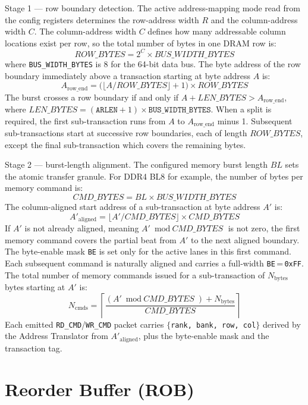 \documentclass[10pt]{article}
\begin{document}
Stage 1 — row boundary detection. The active address-mapping mode read from the config registers determines the row-address width $R$ and the column-address width $C$. The column-address width $C$ defines how many addressable column locations exist per row, so the total number of bytes in one DRAM row is:
\[
  \textit{ROW\_BYTES} = 2^{C} \times \textit{BUS\_WIDTH\_BYTES}
\]
where \texttt{BUS\_WIDTH\_BYTES} is 8 for the 64-bit data bus. The byte address of the row boundary immediately above a transaction starting at byte address $A$ is:
\[
  A_{\text{row\_end}} = \bigl(\lfloor A / \textit{ROW\_BYTES} \rfloor + 1\bigr)
                        \times \textit{ROW\_BYTES}
\]
The burst crosses a row boundary if and only if $A + \textit{LEN\_BYTES} > A_{\text{row\_end}}$, where $\textit{LEN\_BYTES} = (\texttt{ARLEN} + 1) \times \texttt{BUS\_WIDTH\_BYTES}$. When a split is required, the first sub-transaction runs from $A$ to $A_{\text{row\_end}}$ minus 1. Subsequent sub-transactions start at successive row boundaries, each of length $\textit{ROW\_BYTES}$, except the final sub-transaction which covers the remaining bytes.

Stage 2 — burst-length alignment. The configured memory burst length $\textit{BL}$ sets the atomic transfer granule. For DDR4 BL8 for example, the number of bytes per memory command is:
\[
  \textit{CMD\_BYTES} = \textit{BL} \times \textit{BUS\_WIDTH\_BYTES}
\]
The column-aligned start address of a sub-transaction at byte address $A'$ is:
\[
  A'_{\text{aligned}} = \lfloor A' / \textit{CMD\_BYTES} \rfloor
                        \times \textit{CMD\_BYTES}
\]
If $A'$ is not already aligned, meaning $A' \bmod \textit{CMD\_BYTES}$ is not zero, the first memory command covers the partial beat from $A'$ to the next aligned boundary. The byte-enable mask \texttt{BE} is set only for the active lanes in this first command. Each subsequent command is naturally aligned and carries a full-width \texttt{BE}\,=\,\texttt{0xFF}. The total number of memory commands issued for a sub-transaction of $N_{\text{bytes}}$ bytes starting at $A'$ is:
\[
  N_{\text{cmds}} =
    \left\lceil \frac{(A' \bmod \textit{CMD\_BYTES}) + N_{\text{bytes}}}
                     {\textit{CMD\_BYTES}} \right\rceil
\]
Each emitted \texttt{RD\_CMD}/\texttt{WR\_CMD} packet carries $\{$\texttt{rank, bank, row, col}$\}$ derived by the Address Translator from $A'_{\text{aligned}}$, plus the byte-enable mask and the transaction tag.

\section{Reorder Buffer (ROB)}
\end{document}
